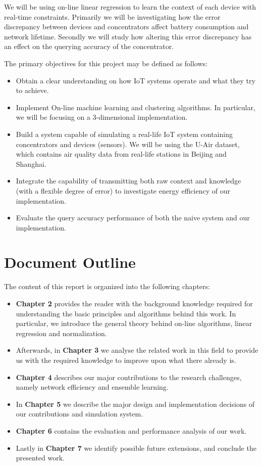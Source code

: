 \documentclass{mproj}
\begin{document}
We will be using on-line linear regression to learn the context of each device with real-time constraints. Primarily we will be investigating how the error discrepancy between devices and concentrators affect battery consumption and network lifetime. Secondly we will study how altering this error discrepancy has an effect on the querying accuracy of the concentrator.

The primary objectives for this project may be defined as follows:
\begin{itemize}  
\item Obtain a clear understanding on how IoT systems operate and what they try to achieve.
\item Implement On-line machine learning and clustering algorithms. In particular, we will be focusing on a 3-dimensional implementation.
\item Build a system capable of simulating a real-life IoT system containing concentrators and devices (sensors). We will be using the U-Air \cite{air-quality-inference-meets-big-data} dataset, which contains air quality data from real-life stations in Beijing and Shanghai.
\item Integrate the capability of transmitting both raw context and knowledge (with a flexible degree of error) to investigate energy efficiency of our implementation.
\item Evaluate the query accuracy performance of both the naive system and our implementation.
\end{itemize}

\section{Document Outline}
The content of this report is organized into the following chapters:
\begin{itemize}
\item \textbf{Chapter 2} provides the reader with the background knowledge required for understanding the basic principles and algorithms behind this work. In particular, we introduce the general theory behind on-line algorithms, linear regression and normalization.
\item Afterwards, in \textbf{Chapter 3} we analyse the related work in this field to provide us with the required knowledge to improve upon what there already is.
\item \textbf{Chapter 4} describes our major contributions to the research challenges, namely network efficiency and ensemble learning.
\item In \textbf{Chapter 5} we describe the major design and implementation decisions of our contributions and simulation system.
\item \textbf{Chapter 6} contains the evaluation and performance analysis of our work.
\item Lastly in \textbf{Chapter 7} we identify possible future extensions, and conclude the presented work.
\end{itemize}
\end{document}
